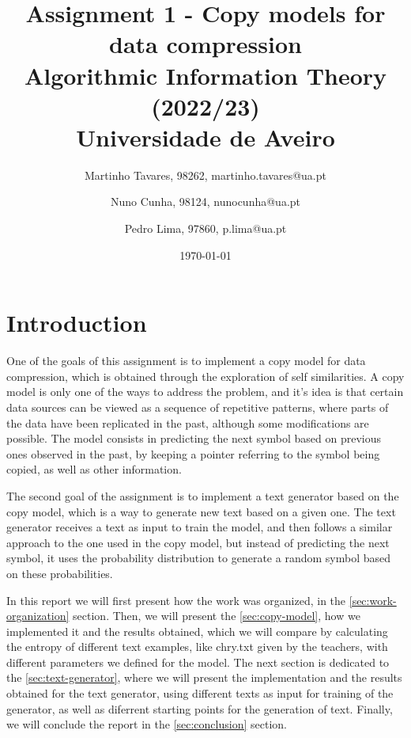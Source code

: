 \documentclass{article}
\begin{document}
\title{
    Assignment 1 - Copy models for data compression \\
    \large{Algorithmic Information Theory (2022/23) \\
    Universidade de Aveiro}
}

\author{
    Martinho Tavares, 98262, martinho.tavares@ua.pt \and
    Nuno Cunha, 98124, nunocunha@ua.pt \and
    Pedro Lima, 97860, p.lima@ua.pt
}

\date{\today}
\maketitle

\nocite{*}

\section{Introduction}

One of the goals of this assignment is to implement a copy model for data compression, which is obtained through the exploration of self similarities.
A copy model is only one of the ways to address the problem, and it's idea is that certain data sources can be viewed as a sequence of repetitive patterns,
where parts of the data have been replicated in the past, although some modifications are possible. 
The model consists in predicting the next symbol based on previous ones observed in the past, by keeping a pointer referring to the symbol being copied, as well as other information.

The second goal of the assignment is to implement a text generator based on the copy model, which is a way to generate new text based on a given one.
The text generator receives a text as input to train the model, and then follows a similar approach to the one used in the copy model,
but instead of predicting the next symbol, it uses the probability distribution to generate a random symbol based on these probabilities.

In this report we will first present how the work was organized, in the \ref{sec:work-organization} section.
Then, we will present the \ref{sec:copy-model}, how we implemented it and the results obtained, which we will compare by calculating the entropy of different text examples,
like chry.txt given by the teachers, with different parameters we defined for the model.
The next section is dedicated to the \ref{sec:text-generator}, where we will present the implementation and the results obtained for the text generator,
using different texts as input for training of the generator, as well as diferrent starting points for the generation of text.
Finally, we will conclude the report in the \ref{sec:conclusion} section.
\end{document}

